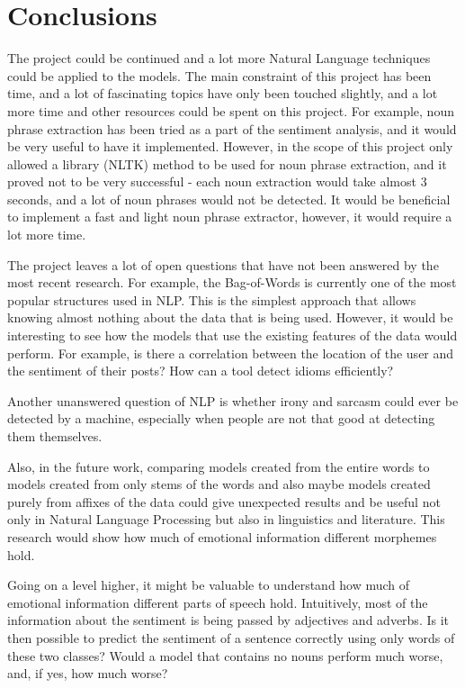 \let\textcircled=\pgftextcircled
\chapter{Conclusions}
\label{chap:conclusions}

\par The project could be continued and a lot more Natural Language techniques could be applied to the models. The main constraint of this project has been time, and a lot of fascinating topics have only been touched slightly, and a lot more time and other resources could be spent on this project. For example, noun phrase extraction has been tried as a part of the sentiment analysis, and it would be very useful to have it implemented. However, in the scope of this project only allowed a library (NLTK) method to be used for noun phrase extraction, and it proved not to be very successful - each noun extraction would take almost 3 seconds, and a lot of noun phrases would not be detected. It would be beneficial to implement a fast and light noun phrase extractor, however, it would require a lot more time. 

The project leaves a lot of open questions that have not been answered by the most recent research. For example, the Bag-of-Words is currently one of the most popular structures used in NLP. This is the simplest approach that allows knowing almost nothing about the data that is being used. However, it would be interesting to see how the models that use the existing features of the data would perform. For example, is there a correlation between the location of the user and the sentiment of their posts? How can a tool detect idioms efficiently? 

Another unanswered question of NLP is whether irony and sarcasm could ever be detected by a machine, especially when people are not that good at detecting them themselves. 

Also, in the future work, comparing models created from the entire words to models created from only stems of the words and also maybe models created purely from affixes of the data could give unexpected results and be useful not only in Natural Language Processing but also in linguistics and literature. This research would show how much of emotional information different morphemes hold.

Going on a level higher, it might be valuable to understand how much of emotional information different parts of speech hold. Intuitively, most of the information about the sentiment is being passed by adjectives and adverbs. Is it then possible to predict the sentiment of a sentence correctly using only words of these two classes? Would a model that contains no nouns perform much worse, and, if yes, how much worse?

